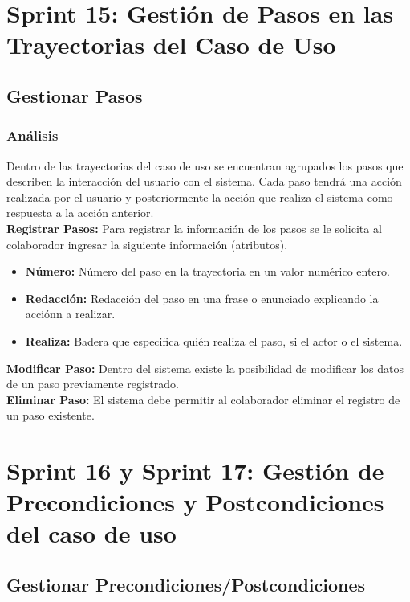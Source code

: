 \section{Sprint 15: Gestión de Pasos en las Trayectorias del Caso de Uso}

\subsection{Gestionar Pasos}
\subsubsection {Análisis}
Dentro de las trayectorias del caso de uso se encuentran agrupados los pasos que describen la interacción del usuario con el sistema. Cada paso tendrá una acción realizada por el usuario y posteriormente la acción que realiza el sistema como respuesta a la acción anterior.\\

\textbf {Registrar Pasos:}
Para registrar la información de los pasos se le solicita al colaborador ingresar la siguiente información (atributos).
\begin{itemize}
	
	\item \textbf{Número:} Número del paso en la trayectoria en un valor numérico entero.
	\item \textbf{Redacción:} Redacción del paso en una frase o enunciado explicando la acciónn a realizar.
	\item \textbf{Realiza:} Badera que especifica quién realiza el paso, si el actor o el sistema.
	
\end{itemize}

\textbf {Modificar Paso:}
Dentro del sistema existe la posibilidad de modificar los datos de un paso previamente registrado.\\

\textbf {Eliminar Paso:} 
El sistema debe permitir al colaborador eliminar el registro de un paso existente.\\

\section{Sprint 16 y Sprint 17: Gestión de Precondiciones y Postcondiciones del caso de uso}
\subsection{Gestionar Precondiciones/Postcondiciones}
